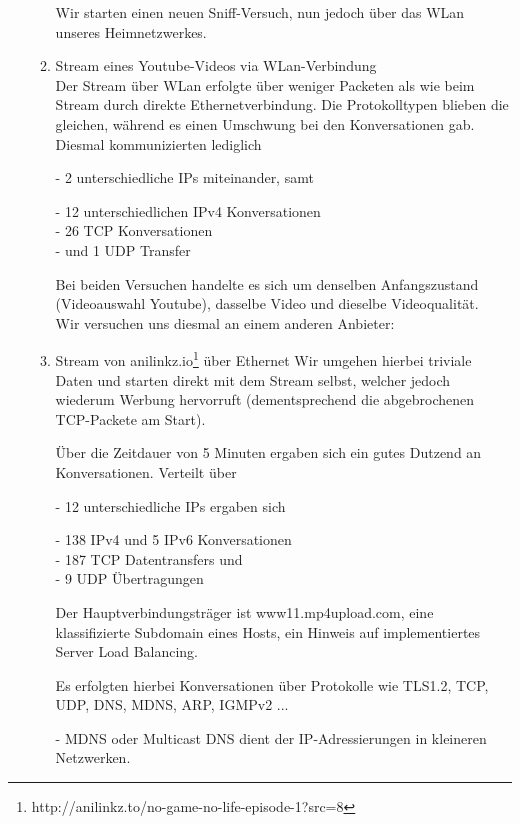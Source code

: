 \documentclass[11pt]{article}
\begin{document}
\begin{enumerate}
\begin{enumerate}[\thesection .1]
        Wir starten einen neuen Sniff-Versuch, nun jedoch über das WLan unseres Heimnetzwerkes.
        \item Stream eines Youtube-Videos via WLan-Verbindung\\
        Der Stream über WLan erfolgte über weniger Packeten als wie beim Stream durch direkte Ethernetverbindung.
        Die Protokolltypen blieben die gleichen, während es einen Umschwung bei den Konversationen gab.
        Diesmal kommunizierten lediglich
        \begin{addmargin}[1em]{1em}
            - 2 unterschiedliche IPs miteinander, samt
            \begin{addmargin}[1em]{1em}
                - 12 unterschiedlichen IPv4 Konversationen\\
                - 26 TCP Konversationen\\
                - und 1 UDP Transfer\\
            \end{addmargin}
        \end{addmargin}

            Bei beiden Versuchen handelte es sich um denselben Anfangszustand (Videoauswahl Youtube),
            dasselbe Video und dieselbe Videoqualität.\\

            Wir versuchen uns diesmal an einem anderen Anbieter:
            \item Stream von anilinkz.io\footnote[1]{http://anilinkz.to/no-game-no-life-episode-1?src=8} über Ethernet
            Wir umgehen hierbei triviale Daten und starten direkt mit dem Stream selbst, welcher jedoch wiederum Werbung hervorruft
            (dementsprechend die abgebrochenen TCP-Packete am Start).

            Über die Zeitdauer von 5 Minuten ergaben sich ein gutes Dutzend an Konversationen.
            Verteilt über
            \begin{addmargin}[1em]{1em}
                - 12 unterschiedliche IPs ergaben sich
                \begin{addmargin}[1em]{1em}
                    - 138 IPv4 und 5 IPv6 Konversationen\\
                    - 187 TCP Datentransfers und \\
                    - 9 UDP Übertragungen\\
                \end{addmargin}
            \end{addmargin}
            Der Hauptverbindungsträger ist www11.mp4upload.com, eine klassifizierte Subdomain eines Hosts, ein Hinweis auf implementiertes Server Load Balancing.

            Es erfolgten hierbei Konversationen über Protokolle wie TLS1.2, TCP, UDP, DNS, MDNS, ARP, IGMPv2 ...
            \begin{addmargin}[1em]{1em}
                - MDNS oder Multicast DNS dient der IP-Adressierungen in kleineren Netzwerken.
            \end{addmargin}
        \end{enumerate}
    \end{enumerate}
\end{document}
